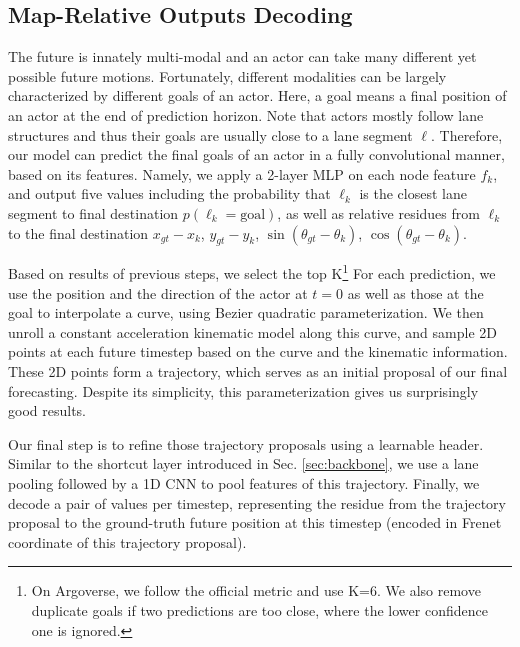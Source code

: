 \subsection{Map-Relative Outputs Decoding}
\label{sec:output}

The future is innately multi-modal and an actor can take many different yet possible
future motions. Fortunately, different modalities can be largely characterized by
different goals of an actor. Here, a goal means a
final position of an actor at the end of prediction horizon. Note that actors
mostly follow lane structures and thus their goals are usually close to a lane
segment $\ell$. Therefore, our model can predict the final goals of an actor in a
fully convolutional manner, based on its \ROI features. Namely, we apply a
2-layer MLP on each node feature $f_k$, and output five values including the
probability that $\ell_k$ is the closest lane segment to final destination 
$p(\ell_k=\text{goal})$, as well as relative residues from $\ell_k$ to the final
destination $x_{gt} - x_{k}$, $y_{gt} - y_{k}$, $\sin(\theta_{gt} - \theta_k)$,
$\cos(\theta_{gt} - \theta_k)$.

Based on results of previous steps, we select the top K\footnote{On
Argoverse, we follow the official metric and use K=6. We also remove duplicate
goals if two predictions are too close, where the lower confidence one is
ignored.} 
For each prediction, we use the position and the direction of the actor at
$t=0$ as well as those at the goal to interpolate a curve, using Bezier
quadratic parameterization. 
We then unroll a constant acceleration kinematic model along this curve, and sample 2D
points at each future timestep based on the curve and the kinematic information.
These 2D points form a trajectory, which serves as an initial proposal of our final forecasting.
Despite its simplicity, this parameterization gives us surprisingly good results.

Our final step is to refine those trajectory proposals using a learnable header. 
Similar to the shortcut layer introduced in Sec.
\ref{sec:backbone}, we use a lane pooling followed by a 1D CNN to 
pool features of this trajectory. Finally, we decode a pair of values per timestep, representing the residue from the trajectory proposal to the
ground-truth future position at this timestep (encoded in Frenet coordinate of
this trajectory proposal). 



